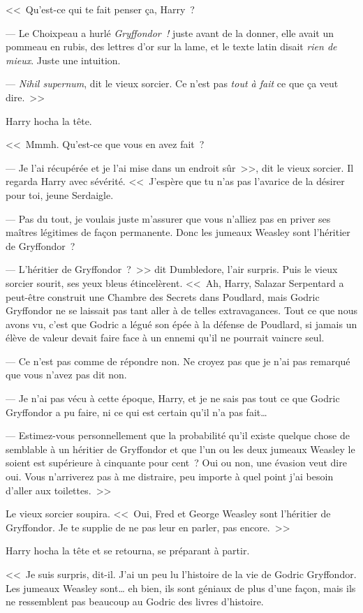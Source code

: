 <<~Qu'est-ce qui te fait penser ça, Harry~?

--- Le Choixpeau a hurlé \emph{Gryffondor~!} juste avant de la donner, elle avait un pommeau en rubis, des lettres d'or sur la lame, et le texte latin disait \emph{rien de mieux}. Juste une intuition.

--- \emph{Nihil supernum}, dit le vieux sorcier. Ce n'est pas \emph{tout à fait} ce que ça veut dire.~>>

Harry hocha la tête.

<<~Mmmh. Qu'est-ce que vous en avez fait~?

--- Je l'ai récupérée et je l'ai mise dans un endroit sûr~>>, dit le vieux sorcier. Il regarda Harry avec sévérité. <<~J'espère que tu n'as pas l'avarice de la désirer pour toi, jeune Serdaigle.

--- Pas du tout, je voulais juste m'assurer que vous n'alliez pas en priver ses maîtres légitimes de façon permanente. Donc les jumeaux Weasley sont l'héritier de Gryffondor~?

--- L'héritier de Gryffondor~?~>> dit Dumbledore, l'air surpris. Puis le vieux sorcier sourit, ses yeux bleus étincelèrent. <<~Ah, Harry, Salazar Serpentard a peut-être construit une Chambre des Secrets dans Poudlard, mais Godric Gryffondor ne se laissait pas tant aller à de telles extravagances. Tout ce que nous avons vu, c'est que Godric a légué son épée à la défense de Poudlard, si jamais un élève de valeur devait faire face à un ennemi qu'il ne pourrait vaincre seul.

--- Ce n'est pas comme de répondre non. Ne croyez pas que je n'ai pas remarqué que vous n'avez pas dit non.

--- Je n'ai pas vécu à cette époque, Harry, et je ne sais pas tout ce que Godric Gryffondor a pu faire, ni ce qui est certain qu'il n'a pas fait…

--- Estimez-vous personnellement que la probabilité qu'il existe quelque chose de semblable à un héritier de Gryffondor et que l'un ou les deux jumeaux Weasley le soient est supérieure à cinquante pour cent~? Oui ou non, une évasion veut dire oui. Vous n'arriverez pas à me distraire, peu importe à quel point j'ai besoin d'aller aux toilettes.~>>

Le vieux sorcier soupira. <<~Oui, Fred et George Weasley sont l'héritier de Gryffondor. Je te supplie de ne pas leur en parler, pas encore.~>>

Harry hocha la tête et se retourna, se préparant à partir.

<<~Je suis surpris, dit-il. J'ai un peu lu l'histoire de la vie de Godric Gryffondor. Les jumeaux Weasley sont… eh bien, ils sont géniaux de plus d'une façon, mais ils ne ressemblent pas beaucoup au Godric des livres d'histoire.

